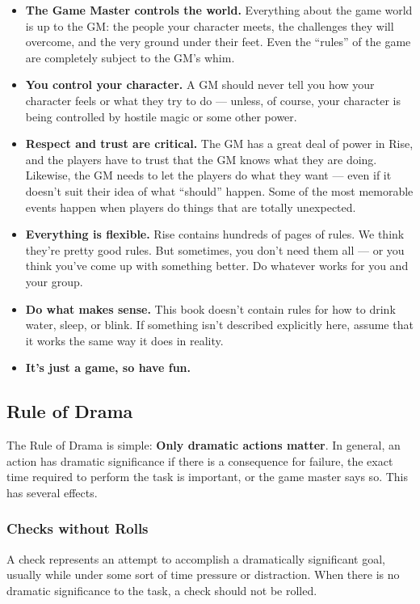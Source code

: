     \begin{itemize}
        \item \textbf{The Game Master controls the world.} Everything about the game world is up to the GM\@: the people your character meets, the challenges they will overcome, and the very ground under their feet.
            Even the ``rules'' of the game are completely subject to the GM's whim.
        \item \textbf{You control your character.} A GM should never tell you how your character feels or what they try to do --- unless, of course, your character is being controlled by hostile magic or some other power.
        \item \textbf{Respect and trust are critical.} The GM has a great deal of power in Rise, and the players have to trust that the GM knows what they are doing.
            Likewise, the GM needs to let the players do what they want --- even if it doesn't suit their idea of what ``should'' happen.
            Some of the most memorable events happen when players do things that are totally unexpected.
        \item \textbf{Everything is flexible.} Rise contains hundreds of pages of rules.
            We think they're pretty good rules.
            But sometimes, you don't need them all --- or you think you've come up with something better.
            Do whatever works for you and your group.
        \item \textbf{Do what makes sense.} This book doesn't contain rules for how to drink water, sleep, or blink.
            If something isn't described explicitly here, assume that it works the same way it does in reality.
        \item \textbf{It's just a game, so have fun.}
    \end{itemize}

    \subsection{Rule of Drama}

        The Rule of Drama is simple: \textbf{Only dramatic actions matter}.
        In general, an action has dramatic significance if there is a consequence for failure, the exact time required to perform the task is important, or the game master says so.
        This has several effects.

        \subsubsection{Checks without Rolls}
            A check represents an attempt to accomplish a dramatically significant goal, usually while under some sort of time pressure or distraction.
            When there is no dramatic significance to the task, a check should not be rolled.


